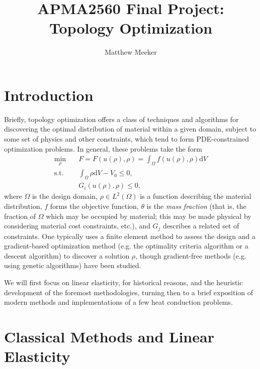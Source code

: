 \documentclass{amsart}
\title{APMA2560 Final Project: Topology Optimization}
\author{Matthew Meeker}
\begin{document}
\maketitle

\section{Introduction}

Briefly, topology optimization offers a class of techniques and algorithms for discovering the optimal distribution of
material within a given domain, subject to some set of physics and other constraints, which tend to form
PDE-constrained optimization problems. In general, these problems take the form
\begin{equation}\label{eq:general_problem}
    \begin{aligned}
        \min_{\rho} &\quad F = F(u(\rho), \rho)=\int_\Omega f(u(\rho), \rho)\mathrm{d}V\\
        \text{s.t.} &\quad \int_\Omega \rho \mathrm{d}V - V_0 \leq 0,\\
         &\quad G_i(u(\rho), \rho) \leq 0,
    \end{aligned}
\end{equation}
where $\Omega$ is the design domain, $\rho \in L^2(\Omega)$ is a function describing the material distribution,
$f$ forms the objective function, $\theta$ is the \textit{mass fraction} (that is, the fraction of $\Omega$
which may be occupied by material; this may be made physical by considering material cost constraints, etc.),
and $G_j$ describes a related set of constraints. One typically uses a finite element method to assess the design
and a gradient-based optimization method (e.g. the optimality criteria algorithm or a descent algorithm) to
discover a solution $\rho$, though gradient-free methods (e.g.  using genetic algorithms) have been studied.

We will first focus on linear elasticity, for historical reasons, and the heuristic development of the foremost
methodologies, turning then to a brief exposition of modern methods and implementations of a few heat conduction 
problems.


\tableofcontents

\section{Classical Methods and Linear Elasticity}

\end{document}
